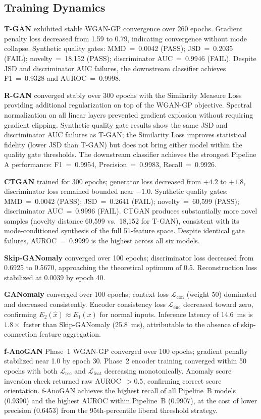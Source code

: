 \documentclass[conference]{IEEEtran}
\begin{document}
\subsection{Training Dynamics}

\textbf{T-GAN} exhibited stable WGAN-GP convergence over 260 epochs. Gradient
penalty loss decreased from 1.59 to 0.79, indicating convergence without mode
collapse. Synthetic quality gates: MMD~=~0.0042 (PASS); JSD~=~0.2035 (FAIL);
novelty~=~18,152 (PASS); discriminator AUC~=~0.9946 (FAIL). Despite JSD and
discriminator AUC failures, the downstream classifier achieves F1~=~0.9328
and AUROC~=~0.9998.

\textbf{R-GAN} converged stably over 300 epochs with the Similarity Measure
Loss providing additional regularization on top of the WGAN-GP objective.
Spectral normalization on all linear layers prevented gradient explosion
without requiring gradient clipping. Synthetic quality gate results show the
same JSD and discriminator AUC failures as T-GAN; the Similarity Loss
improves statistical fidelity (lower JSD than T-GAN) but does not bring
either model within the quality gate thresholds. The downstream classifier
achieves the strongest Pipeline A performance: F1~=~0.9954, Precision~=~0.9983,
Recall~=~0.9926.

\textbf{CTGAN} trained for 300 epochs; generator loss decreased from $+4.2$
to $+1.8$, discriminator loss remained bounded near $-1.0$. Synthetic quality
gates: MMD~=~0.0042 (PASS); JSD~=~0.2641 (FAIL); novelty~=~60,599 (PASS);
discriminator AUC~=~0.9996 (FAIL). CTGAN produces substantially more novel
samples (novelty distance 60,599 vs.\ 18,152 for T-GAN), consistent with its
mode-conditioned synthesis of the full 51-feature space. Despite identical
gate failures, AUROC~=~0.9999 is the highest across all six models.

\textbf{Skip-GANomaly} converged over 100 epochs; discriminator loss
decreased from 0.6925 to 0.5670, approaching the theoretical optimum of 0.5.
Reconstruction loss stabilized at 0.0039 by epoch 40.

\textbf{GANomaly} converged over 100 epochs; context loss
$\mathcal{L}_\text{con}$ (weight 50) dominated and decreased consistently.
Encoder consistency loss $\mathcal{L}_\text{enc}$ decreased toward zero,
confirming $E_2(\hat{x}) \approx E_1(x)$ for normal inputs. Inference
latency of 14.6~ms is $1.8\times$ faster than Skip-GANomaly (25.8~ms),
attributable to the absence of skip-connection feature aggregation.

\textbf{f-AnoGAN} Phase~1 WGAN-GP converged over 100 epochs; gradient
penalty stabilized near 1.0 by epoch 30. Phase~2 encoder training converged
within 50 epochs with both $\mathcal{L}_\text{rec}$ and
$\mathcal{L}_\text{feat}$ decreasing monotonically. Anomaly score inversion
check returned raw AUROC~$>0.5$, confirming correct score orientation.
f-AnoGAN achieves the highest recall of all Pipeline~B models (0.9390) and
the highest AUROC within Pipeline~B (0.9907), at the cost of lower precision
(0.6453) from the 95th-percentile liberal threshold strategy.
\end{document}

